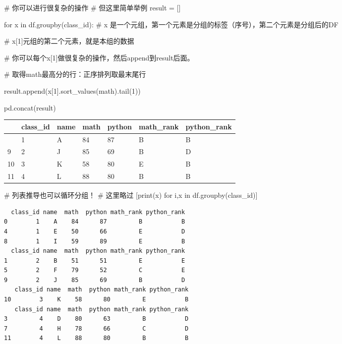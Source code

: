 \documentclass[
  letterpaper,
  DIV=11,
  numbers=noendperiod]{scrreprt}
\newenvironment{Shaded}{\begin{snugshade}}{\end{snugshade}}
\newcommand{\BuiltInTok}[1]{\textcolor[rgb]{0.00,0.23,0.31}{#1}}
\newcommand{\CommentTok}[1]{\textcolor[rgb]{0.37,0.37,0.37}{#1}}
\newcommand{\ControlFlowTok}[1]{\textcolor[rgb]{0.00,0.23,0.31}{#1}}
\newcommand{\DecValTok}[1]{\textcolor[rgb]{0.68,0.00,0.00}{#1}}
\newcommand{\KeywordTok}[1]{\textcolor[rgb]{0.00,0.23,0.31}{#1}}
\newcommand{\NormalTok}[1]{\textcolor[rgb]{0.00,0.23,0.31}{#1}}
\newcommand{\OperatorTok}[1]{\textcolor[rgb]{0.37,0.37,0.37}{#1}}
\newcommand{\StringTok}[1]{\textcolor[rgb]{0.13,0.47,0.30}{#1}}
\begin{document}
\begin{Shaded}
\begin{Highlighting}[]
\CommentTok{\# 你可以进行很复杂的操作}
\CommentTok{\# 但这里简单举例}
\NormalTok{result }\OperatorTok{=}\NormalTok{ []}

\ControlFlowTok{for}\NormalTok{ x }\KeywordTok{in}\NormalTok{ df.groupby(}\StringTok{\textquotesingle{}class\_id\textquotesingle{}}\NormalTok{):}
    \CommentTok{\# x 是一个元组，第一个元素是分组的标签（序号），第二个元素是分组后的DF}
    
    \CommentTok{\# x[1]元组的第二个元素，就是本组的数据}

    \CommentTok{\# 你可以每个x[1]做很复杂的操作，然后append到result后面。}
    
    \CommentTok{\# 取得math最高分的行：正序排列取最末尾行}
    
\NormalTok{    result.append(x[}\DecValTok{1}\NormalTok{].sort\_values(}\StringTok{\textquotesingle{}math\textquotesingle{}}\NormalTok{).tail(}\DecValTok{1}\NormalTok{))}


\NormalTok{pd.concat(result)}
\end{Highlighting}
\end{Shaded}

\begin{longtable}[]{@{}lllllll@{}}
\toprule\noalign{}
& class\_id & name & math & python & math\_rank & python\_rank \\
\midrule\noalign{}
\endhead
\bottomrule\noalign{}
\endlastfoot
0 & 1 & A & 84 & 87 & B & B \\
9 & 2 & J & 85 & 69 & B & D \\
10 & 3 & K & 58 & 80 & E & B \\
11 & 4 & L & 88 & 80 & B & B \\
\end{longtable}

\begin{Shaded}
\begin{Highlighting}[]
\CommentTok{\# 列表推导也可以循环分组！}
\CommentTok{\# 这里略过}
\NormalTok{[}\BuiltInTok{print}\NormalTok{(x) }\ControlFlowTok{for}\NormalTok{ i,x }\KeywordTok{in}\NormalTok{ df.groupby(}\StringTok{\textquotesingle{}class\_id\textquotesingle{}}\NormalTok{)]}
\end{Highlighting}
\end{Shaded}

\begin{verbatim}
  class_id name  math  python math_rank python_rank
0        1    A    84      87         B           B
4        1    E    50      66         E           D
8        1    I    59      89         E           B
  class_id name  math  python math_rank python_rank
1        2    B    51      51         E           E
5        2    F    79      52         C           E
9        2    J    85      69         B           D
   class_id name  math  python math_rank python_rank
10        3    K    58      80         E           B
   class_id name  math  python math_rank python_rank
3         4    D    80      63         B           D
7         4    H    78      66         C           D
11        4    L    88      80         B           B
\end{verbatim}
\end{document}
